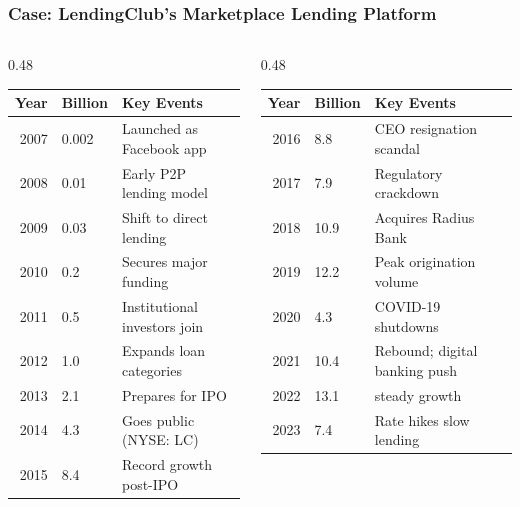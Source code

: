 \documentclass[aspectratio=169,xcolor=dvipsnames]{beamer}
\begin{document}
\begin{frame}
\frametitle{Case: LendingClub's Marketplace Lending Platform}


\footnotesize
\begin{columns}[T]
    \begin{column}{0.48\textwidth}
        \begin{tabular}{rlp{3.5cm}}
            \toprule
            \textbf{Year} & \textbf{Billion} & \textbf{Key Events} \\
            \midrule
            2007 & 0.002 & Launched as Facebook app \\
            2008 & 0.01 & Early P2P lending model \\
            2009 & 0.03 & Shift to direct lending \\
            2010 & 0.2 & Secures major funding \\
            2011 & 0.5 & Institutional investors join \\
            2012 & 1.0 & Expands loan categories \\
            2013 & 2.1 & Prepares for IPO \\
            2014 & 4.3 & Goes public (NYSE: LC) \\
            2015 & 8.4 & Record growth post-IPO \\
            \bottomrule
        \end{tabular}
    \end{column}

    \begin{column}{0.48\textwidth}
        \begin{tabular}{rlp{3.5cm}}
            \toprule
            \textbf{Year} & \textbf{Billion} & \textbf{Key Events} \\
            \midrule
            2016 & 8.8 & CEO resignation scandal \\
            2017 & 7.9 & Regulatory crackdown \\
            2018 & 10.9 & Acquires Radius Bank \\
            2019 & 12.2 & Peak origination volume \\
            2020 & 4.3 & COVID-19 shutdowns \\
            2021 & 10.4 & Rebound; digital banking push \\
            2022 & 13.1 & steady growth \\
            2023 & 7.4 & Rate hikes slow lending \\
            \bottomrule
        \end{tabular}
    \end{column}
\end{columns}




\end{frame} 
\end{document}
